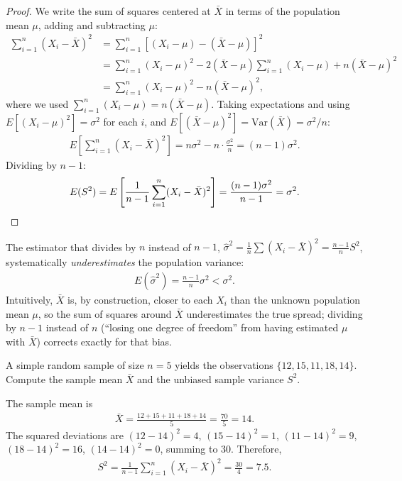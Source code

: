 \begin{proof}
We write the sum of squares centered at $\bar{X}$ in terms of the population mean $\mu$, adding and subtracting $\mu$:
\begin{align}
 \sum_{i=1}^n (X_i - \bar{X})^2
 &= \sum_{i=1}^n \left[(X_i - \mu) - (\bar{X} - \mu)\right]^2 \\
 &= \sum_{i=1}^n (X_i - \mu)^2 - 2(\bar{X}-\mu)\sum_{i=1}^n(X_i-\mu) + n(\bar{X}-\mu)^2 \\
 &= \sum_{i=1}^n (X_i - \mu)^2 - n(\bar{X}-\mu)^2,
\end{align}
where we used $\sum_{i=1}^n (X_i - \mu) = n(\bar{X}-\mu)$. Taking expectations and using $E[(X_i-\mu)^2] = \sigma^2$ for each $i$, and $E[(\bar{X}-\mu)^2] = \text{Var}(\bar{X}) = \sigma^2/n$:
\begin{align}
 E\left[\sum_{i=1}^n (X_i - \bar{X})^2\right] = n\sigma^2 - n\cdot\frac{\sigma^2}{n}
 = (n-1)\sigma^2.
\end{align}
Dividing by $n-1$:
\begin{align}
 E(S^2) = E\left[\frac{1}{n-1}\sum_{i=1}^n (X_i - \bar{X})^2\right]
 = \frac{(n-1)\sigma^2}{n-1} = \sigma^2. \qedhere
\end{align}
\end{proof}

\begin{observacion}
The estimator that divides by $n$ instead of $n-1$, $\hat{\sigma}^2 = \frac{1}{n}\sum(X_i-\bar{X})^2 = \frac{n-1}{n}S^2$, systematically \emph{underestimates} the population variance:
\begin{align}
 E(\hat{\sigma}^2) = \frac{n-1}{n}\sigma^2 < \sigma^2.
\end{align}
Intuitively, $\bar{X}$ is, by construction, closer to each $X_i$ than the unknown population mean $\mu$, so the sum of squares around $\bar{X}$ underestimates the true spread; dividing by $n-1$ instead of $n$ (``losing one degree of freedom'' from having estimated $\mu$ with $\bar{X}$) corrects exactly for that bias.
\end{observacion}

\begin{ejemplo}
 \label{exmp:5.1.1}
A simple random sample of size $n=5$ yields the observations $\{12, 15, 11, 18, 14\}$. Compute the sample mean $\bar{X}$ and the unbiased sample variance $S^2$.
\end{ejemplo}

\begin{solucion}
The sample mean is
\begin{align}
 \bar{X} = \frac{12+15+11+18+14}{5} = \frac{70}{5} = 14.
\end{align}
The squared deviations are $(12-14)^2=4$, $(15-14)^2=1$, $(11-14)^2=9$, $(18-14)^2=16$, $(14-14)^2=0$, summing to $30$. Therefore,
\begin{align}
 S^2 = \frac{1}{n-1}\sum_{i=1}^n (X_i-\bar{X})^2 = \frac{30}{4} = 7.5.
\end{align}
\end{solucion}



